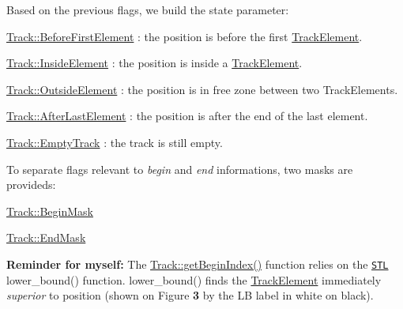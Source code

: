 Based on the previous flags, we build the {\ttfamily state} parameter\+:
\begin{DoxyItemize}
\item \mbox{\hyperlink{classKite_1_1Track_af4bdc8469c0fee386fc2ff30e0666bcaa5c7f72d6942ae38d66f530bea1063adf}{Track\+::\+Before\+First\+Element}} \+: the {\ttfamily position} is before the first \mbox{\hyperlink{classKite_1_1TrackElement}{Track\+Element}}.
\item \mbox{\hyperlink{classKite_1_1Track_af4bdc8469c0fee386fc2ff30e0666bcaa36e625d718c74f5ff503638360ba1166}{Track\+::\+Inside\+Element}} \+: the {\ttfamily position} is inside a \mbox{\hyperlink{classKite_1_1TrackElement}{Track\+Element}}.
\item \mbox{\hyperlink{classKite_1_1Track_af4bdc8469c0fee386fc2ff30e0666bcaa55d08f66f21334eb8c0dca170f1cb8a4}{Track\+::\+Outside\+Element}} \+: the {\ttfamily position} is in free zone between two Track\+Elements.
\item \mbox{\hyperlink{classKite_1_1Track_af4bdc8469c0fee386fc2ff30e0666bcaa3fc579452c9779cd2865d5019a61c6a5}{Track\+::\+After\+Last\+Element}} \+: the position is after the end of the last element.
\item \mbox{\hyperlink{classKite_1_1Track_af4bdc8469c0fee386fc2ff30e0666bcaaa697b71e325cea0980e9555654f8f3cf}{Track\+::\+Empty\+Track}} \+: the track is still empty.
\end{DoxyItemize}

To separate flags relevant to {\itshape begin} and {\itshape end} informations, two masks are provideds\+:
\begin{DoxyItemize}
\item \mbox{\hyperlink{classKite_1_1Track_af4bdc8469c0fee386fc2ff30e0666bcaa8621fa6a5b7a491fd1bf8dd7f0dd3589}{Track\+::\+Begin\+Mask}}
\item \mbox{\hyperlink{classKite_1_1Track_af4bdc8469c0fee386fc2ff30e0666bcaa0b5a81972d3a6718c3d68199467d2d11}{Track\+::\+End\+Mask}}
\end{DoxyItemize}

 {\bfseries Reminder for myself\+:} The \mbox{\hyperlink{classKite_1_1Track_a33a6c0eebb0d4d50f639ae49a4d6252f}{Track\+::get\+Begin\+Index()}} function relies on the \href{http://www.sgi.com/tech/stl/}{\tt S\+TL} {\ttfamily lower\+\_\+bound()} function. {\ttfamily lower\+\_\+bound()} finds the \mbox{\hyperlink{classKite_1_1TrackElement}{Track\+Element}} immediately {\itshape superior} to {\ttfamily position} (shown on Figure {\bfseries 3} by the {\ttfamily LB} label in white on black).

